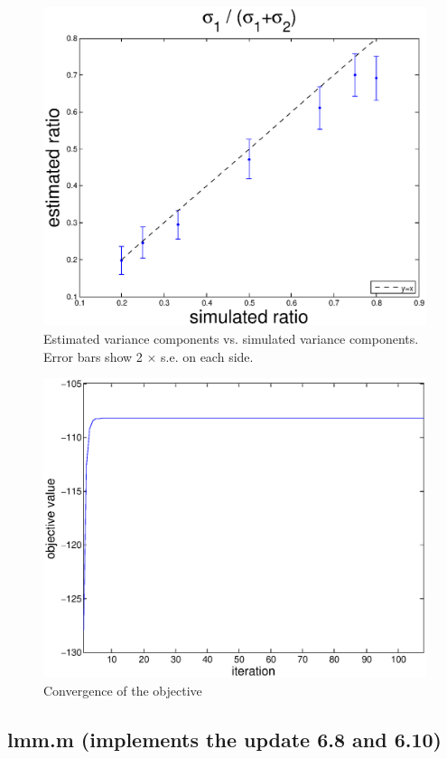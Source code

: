 \documentclass{scrartcl}
\begin{document}
\begin{figure}[H]
\begin{minipage}[b]{0.3\textwidth}
    \centering
    \includegraphics[scale=0.26]{ratio.eps}
  \end{minipage}
  \caption{Estimated variance components vs. simulated variance components. Error bars show 2 $\times$ s.e. on each side.}
  \label{fig:prob16_result}
\end{figure}

\begin{figure}[H]
\centering
\includegraphics[scale=0.5]{obj_plot.eps}
\caption{Convergence of the objective}
\end{figure}

\subsection*{lmm.m (implements the update 6.8 and 6.10)}
\end{document}
